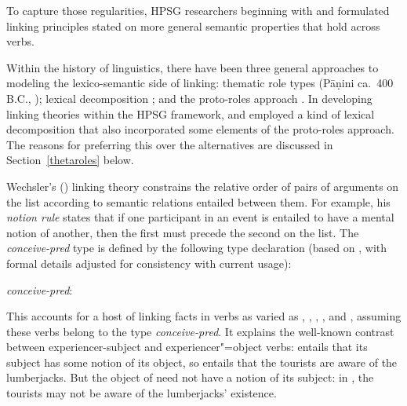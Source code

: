 \documentclass[output=paper
 	        ,biblatex
                ,babelshorthands
                ,newtxmath
                ,draftmode
                ,colorlinks, citecolor=brown
]{langscibook}
\begin{document}
\begin{sloppypar}
To capture those regularities, HPSG researchers beginning with \citet{Wechsler1995b} and
\citet{Davis1996} formulated linking principles stated on more general semantic properties that hold
across verbs.
\end{sloppypar}

Within the history of linguistics, there have been three general approaches to modeling the
lexico-semantic side of linking: thematic role types (P\={a}\d{n}ini ca.\ 400 B.C., \citealt{Fillmore1968}); lexical
decomposition \citep{FoleyandvanValin1984,RappaportandLevin1998}; and the
proto-roles approach
\citep{Dowty1991}.  In developing linking theories within the HPSG framework, \citet{Wechsler1995b}
and \citet{Davis1996} employed a kind of lexical decomposition that also incorporated some elements
of the proto-roles approach.  The reasons for preferring this over the alternatives are discussed in
Section~\ref{thetaroles} below.

Wechsler's (\citeyear{Wechsler1995b}) linking theory constrains the
relative order of pairs of arguments on the \argst list according to semantic relations entailed
between them.  For example, his \emph{notion rule} states
that if one participant in an event is entailed to have a mental notion of another, then the first
must precede the second on the \argst list.  The \textit{conceive-pred} type is defined by the
following type declaration (based on \citealt[127]{Wechsler1995b}, with formal details adjusted for
consistency with current usage):

\begin{exe}
\ex\label{conceive}
\textit{conceive-pred}:\\  
\end{exe}

This accounts for a host of linking facts in verbs as varied as , ,
, , and , assuming these verbs belong to the type
\textit{conceive-pred}.  It explains the well-known contrast between experiencer-subject 
and experiencer"=object  verbs:  entails that its subject has some notion
of its object, so  entails that the tourists are aware of
the lumberjacks.  But the object of  need not have a notion of its subject: in
, the tourists may not be aware of the lumberjacks' existence.
\end{document}
